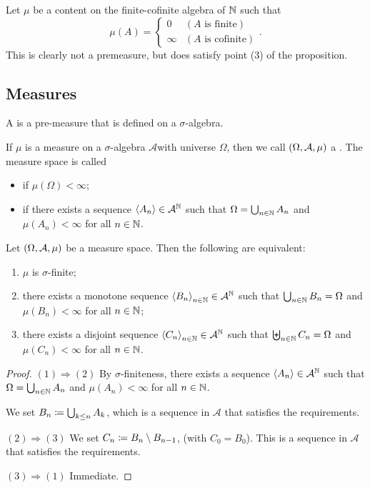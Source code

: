 \begin{example}
Let $\mu$ be a content on the finite-cofinite algebra of $\mathbb{N}$ such that
\[ \mu(A) = \begin{cases}
0 & (\text{$A$ is finite}) \\ \infty & (\text{$A$ is cofinite})
\end{cases}. \]
This is clearly not a premeasure, but does satisfy point (3) of the proposition.
\end{example}

\subsection{Measures}
\begin{definition}
A  is a pre-measure that is defined on a $\sigma$-algebra.

If $\mu$ is a measure on a $\sigma$-algebra $\mathcal{A}$with universe $\Omega$, then we call $\left( \Omega, \mathcal{A}, \mu \right)$ a . The measure space is called
\begin{itemize}
\item {} if $\mu(\Omega) < \infty$;
\item {} if there exists a sequence $\left\langle A_n \right\rangle\in \mathcal{A}^{\mathbb{N}}$ such that $\Omega = \bigcup_{n\in\mathbb{N}}A_n$ and $\mu(A_n)<\infty$ for all $n\in\mathbb{N}$.
\end{itemize}
\end{definition}

\begin{lemma} \label{sigmaFiniteSequences}
Let $\left( \Omega, \mathcal{A}, \mu \right)$ be a measure space. Then the following are equivalent:
\begin{enumerate}
\item $\mu$ is $\sigma$-finite;
\item there exists a monotone sequence $\left\langle B_n \right\rangle_{n\in \mathbb{N}}\in\mathcal{A}^{\mathbb{N}}$ such that $\bigcup_{n\in\mathbb{N}}B_n = \Omega$ and $\mu(B_n) < \infty$ for all $n\in\mathbb{N}$;
\item there exists a disjoint sequence $\left\langle C_n \right\rangle_{n\in \mathbb{N}}\in\mathcal{A}^{\mathbb{N}}$ such that $\biguplus_{n\in\mathbb{N}}C_n = \Omega$ and $\mu(C_n) < \infty$ for all $n\in\mathbb{N}$.
\end{enumerate}
\end{lemma}
\begin{proof}
$(1) \Rightarrow (2)$ By $\sigma$-finiteness, there exists a sequence $\left\langle A_n \right\rangle\in \mathcal{A}^{\mathbb{N}}$ such that $\Omega = \bigcup_{n\in\mathbb{N}}A_n$ and $\mu(A_n)<\infty$ for all $n\in\mathbb{N}$.

We set $B_n \coloneqq \bigcup_{k\leq n} A_k$, which is a sequence in $\mathcal{A}$ that satisfies the requirements.

$(2) \Rightarrow (3)$ We set $C_n \coloneqq B_n\setminus B_{n-1}$, (with $C_0 = B_0$). This is a sequence in $\mathcal{A}$ that satisfies the requirements.

$(3) \Rightarrow (1)$ Immediate.
\end{proof}

